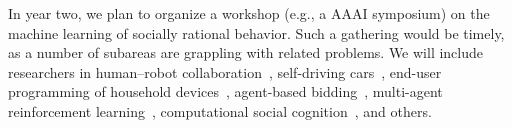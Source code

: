 In year two, we plan to organize a workshop (e.g., a AAAI symposium)
on the machine learning of socially rational behavior. Such a
gathering would be timely, as a number of subareas are grappling with
related problems. We will include researchers in human--robot
collaboration~\cite{gopalan15}, self-driving
cars~\cite{dolgov2010path}, end-user programming of household
devices~\cite{ur14}, agent-based bidding~\cite{tac:book}, multi-agent
reinforcement learning~\cite{sodomka13}, computational social
cognition~\cite{baker14}, and others.
